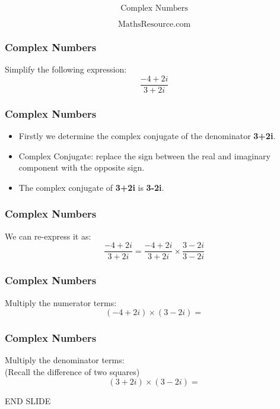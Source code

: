 \documentclass{beamer}
\begin{document}
\begin{frame}
\Huge
\[ \mbox{Complex Numbers} \]

\LARGE
\[ \mbox{MathsResource.com} \]

\end{frame}
\begin{frame}
\frametitle{Complex Numbers}
{
\LARGE
Simplify the following expression:
\[ \frac{-4+2i}{3+2i}
\]
}
\end{frame}


\begin{frame}
\frametitle{Complex Numbers}
{
\LARGE
\begin{itemize}
\item Firstly we determine the complex conjugate of the denominator \textbf{3+2i}.
\item Complex Conjugate: replace the sign between the real and imaginary component with the opposite sign.
\item The complex conjugate of \textbf{3\alert{+}2i} is \textbf{3\alert{-}2i}.
\end{itemize}
}
\end{frame}

\begin{frame}
\frametitle{Complex Numbers}
{
\LARGE
We can re-express it as:\\
\[ \frac{-4+2i}{3+2i} = \frac{-4+2i}{3+2i} \times \frac{3-2i}{3-2i}
\]
}
\end{frame}
\begin{frame}
\frametitle{Complex Numbers}
{
\LARGE
\vspace{-2.5cm}
Multiply the numerator terms:\\

\[(-4+2i) \times (3-2i) =  
\]
}
\end{frame}
\begin{frame}
\frametitle{Complex Numbers}
{
\LARGE
\vspace{-2.5cm}
Multiply the denominator terms:\\
(Recall the difference of two squares)
\[(3+2i) \times (3-2i) =  
\]


}
\end{frame}
\begin{frame}
END SLIDE
\end{frame}
\end{document}
